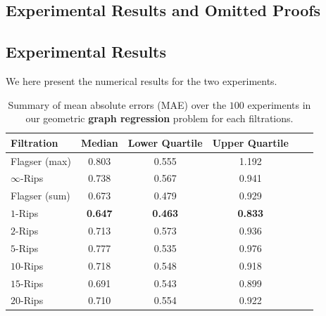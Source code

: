 \documentclass[a4paper,11pt]{article}
\theoremstyle{remark}
\begin{document}
\begin{appendices}
\section{Experimental Results and Omitted Proofs}\label{sec:appendix}
\subsection{Experimental Results}
\label{sec:appendix_experimental_results}
We here present the numerical results for the two experiments.
\begin{table}[ht]
\centering
\begin{tabular}{@{}lccccc@{}}
\toprule
\textbf{Filtration} & \textbf{Median} & \textbf{Lower Quartile} & \textbf{Upper Quartile} \\ \midrule
Flagser (max) & 0.803 & 0.555 & 1.192 \\
$\infty$-Rips & 0.738 & 0.567 & 0.941 \\ \midrule
Flagser (sum) & 0.673 & 0.479 & 0.929 \\
$1$-Rips & \textbf{0.647} & \textbf{0.463} & \textbf{0.833} \\ \midrule
$2$-Rips & 0.713 & 0.573 & 0.936 \\
$5$-Rips & 0.777 & 0.535 & 0.976 \\
$10$-Rips & 0.718 & 0.548 & 0.918 \\
$15$-Rips & 0.691 & 0.543 & 0.899 \\
$20$-Rips & 0.710 & 0.554 & 0.922 \\
\bottomrule
\end{tabular}
\caption{Summary of mean absolute errors (MAE) over the $100$ experiments in our geometric \textbf{graph regression} problem for each filtrations.}
\label{table:all_mae_scores_drgg_experiment}
\end{table}


\end{appendices}
\end{document}
